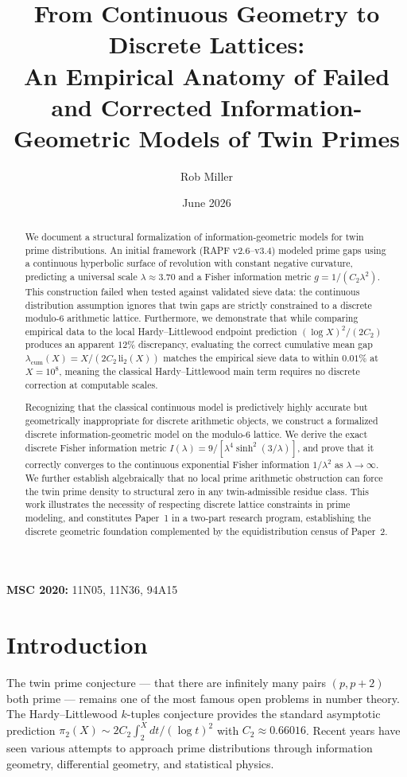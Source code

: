 \documentclass[11pt]{article}
\title{From Continuous Geometry to Discrete Lattices: \\ An Empirical Anatomy of Failed and Corrected Information-Geometric Models of Twin Primes}
\author{Rob Miller}
\date{June 2026}
\begin{document}
\maketitle

\begin{abstract}
We document a structural formalization of information-geometric models for twin prime distributions. An initial framework (RAPF v2.6--v3.4) modeled prime gaps using a continuous hyperbolic surface of revolution with constant negative curvature, predicting a universal scale $\lambda \approx 3.70$ and a Fisher information metric $g = 1/(C_2\lambda^2)$. This construction failed when tested against validated sieve data: the continuous distribution assumption ignores that twin gaps are strictly constrained to a discrete modulo-6 arithmetic lattice. Furthermore, we demonstrate that while comparing empirical data to the local Hardy--Littlewood endpoint prediction $(\log X)^2/(2C_2)$ produces an apparent $12\%$ discrepancy, evaluating the correct cumulative mean gap $\lambda_{\mathrm{cum}}(X) = X/(2C_2\,\mathrm{li}_2(X))$ matches the empirical sieve data to within $0.01\%$ at $X = 10^8$, meaning the classical Hardy--Littlewood main term requires no discrete correction at computable scales.

Recognizing that the classical continuous model is predictively highly accurate but geometrically inappropriate for discrete arithmetic objects, we construct a formalized discrete information-geometric model on the modulo-6 lattice. We derive the exact discrete Fisher information metric $I(\lambda) = 9/[\lambda^4 \sinh^2(3/\lambda)]$, and prove that it correctly converges to the continuous exponential Fisher information $1/\lambda^2$ as $\lambda \to \infty$. We further establish algebraically that no local prime arithmetic obstruction can force the twin prime density to structural zero in any twin-admissible residue class. This work illustrates the necessity of respecting discrete lattice constraints in prime modeling, and constitutes Paper~1 in a two-part research program, establishing the discrete geometric foundation complemented by the equidistribution census of Paper~2.

\end{abstract}

\noindent \textbf{MSC 2020:} 11N05, 11N36, 94A15

\section{Introduction}
The twin prime conjecture --- that there are infinitely many pairs $(p, p+2)$ both prime --- remains one of the most famous open problems in number theory. The Hardy--Littlewood $k$-tuples conjecture provides the standard asymptotic prediction $\pi_2(X) \sim 2C_2 \int_2^X dt/(\log t)^2$ with $C_2 \approx 0.66016$. Recent years have seen various attempts to approach prime distributions through information geometry, differential geometry, and statistical physics.
\end{document}
